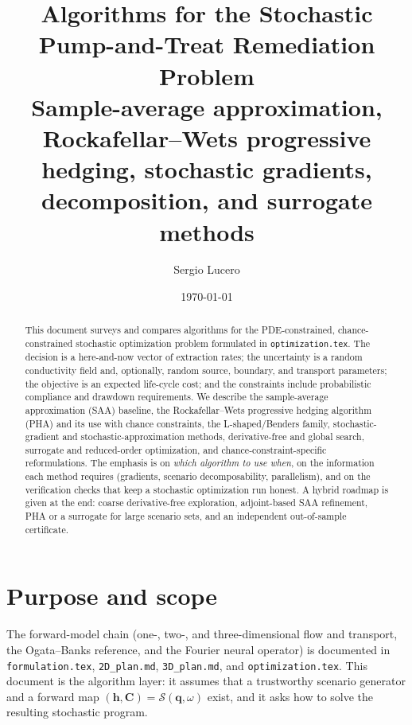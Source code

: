 \documentclass[11pt]{article}
\title{Algorithms for the Stochastic Pump-and-Treat Remediation Problem\\[2pt]
\large Sample-average approximation, Rockafellar--Wets progressive hedging,
stochastic gradients, decomposition, and surrogate methods}
\author{Sergio Lucero}
\date{\today}
\numberwithin{equation}{section}
\newcommand{\qq}{\mathbf{q}}
\theoremstyle{plain}
\begin{document}
\maketitle

\begin{abstract}
This document surveys and compares algorithms for the PDE-constrained,
chance-constrained stochastic optimization problem formulated in
\texttt{optimization.tex}.  The decision is a here-and-now vector of extraction
rates; the uncertainty is a random conductivity field and, optionally, random
source, boundary, and transport parameters; the objective is an expected
life-cycle cost; and the constraints include probabilistic compliance and
drawdown requirements.  We describe the sample-average approximation (SAA)
baseline, the Rockafellar--Wets progressive hedging algorithm (PHA) and its
use with chance constraints, the L-shaped/Benders family, stochastic-gradient
and stochastic-approximation methods, derivative-free and global search,
surrogate and reduced-order optimization, and chance-constraint-specific
reformulations.  The emphasis is on \emph{which algorithm to use when}, on the
information each method requires (gradients, scenario decomposability,
parallelism), and on the verification checks that keep a stochastic
optimization run honest.  A hybrid roadmap is given at the end: coarse
derivative-free exploration, adjoint-based SAA refinement, PHA or a surrogate
for large scenario sets, and an independent out-of-sample certificate.
\end{abstract}

\tableofcontents

\section{Purpose and scope}
\label{sec:purpose}

The forward-model chain (one-, two-, and three-dimensional flow and transport,
the Ogata--Banks reference, and the Fourier neural operator) is documented in
\texttt{formulation.tex}, \texttt{2D\_plan.md}, \texttt{3D\_plan.md}, and
\texttt{optimization.tex}.  This document is the algorithm layer: it assumes
that a trustworthy scenario generator and a forward map
$(\mathbf{h},\mathbf{C})=\mathcal{S}(\qq,\omega)$ exist, and it asks how to
solve the resulting stochastic program.
\end{document}
